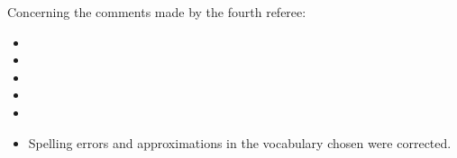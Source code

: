\documentclass[11pt,a4paper,sans]{moderncv}        %
\begin{document}
 
Concerning the comments made by the fourth referee:


\begin{itemize}
	\item 
	
	\item 
	
	\item 
	
	\item {}
	
	\item 
	
	\item Spelling errors and approximations in the vocabulary chosen were corrected.
\end{itemize}







\justify




\makeletterclosing
\end{document}
